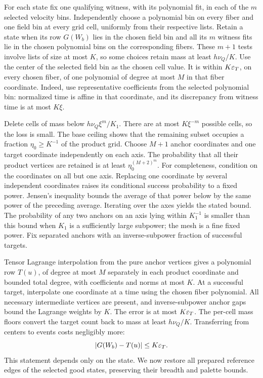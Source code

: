 For each state fix one qualifying witness, with its polynomial fit,
in each of the \(m\) selected velocity bins. Independently choose a
polynomial bin on every fiber and one field bin at every grid cell,
uniformly from their respective lists.
Retain a state when its row \(G(W_b)\) lies in the chosen field bin
and all its \(m\) witness fits lie in the chosen polynomial bins on
the corresponding fibers. These \(m+1\) tests involve lists of size
at most \(K\), so some choices retain mass at least \(h\nu_Q/K\).
Use the center of the selected field bin as the chosen cell value.
It is within \(K\varepsilon_T\), on every chosen fiber, of one polynomial
of degree at most \(M\) in that fiber coordinate. Indeed, use
representative coefficients from the selected polynomial bin:
normalized time is affine in that coordinate, and its discrepancy
from witness time is at most \(K\xi\).

Delete cells of mass below \(h\nu_Q\xi^m/K_1\).
There are at most \(K\xi^{-m}\) possible cells, so the loss is
small. The base ceiling shows that the remaining subset occupies
a fraction \(\eta_0\geq K^{-1}\) of the product grid.
Choose \(M+1\) anchor coordinates and one target coordinate
independently on each axis. The probability that all their
product vertices are retained is at least
\(\eta_0^{(M+2)^m}\).
For completeness, condition on the coordinates on all but one
axis. Replacing one coordinate by several independent coordinates
raises its conditional success probability to a fixed power.
Jensen's inequality bounds the average of that power below by
the same power of the preceding average. Iterating over the
axes yields the stated bound.
The probability of any two anchors on an axis lying within
\(K_1^{-1}\) is smaller than this bound when \(K_1\) is a
sufficiently large subpower; the mesh is a fine fixed power.
Fix separated anchors with an inverse-subpower fraction of
successful targets.

Tensor Lagrange interpolation from the pure anchor vertices gives
a polynomial row \(T(u)\), of degree at most \(M\) separately in
each product coordinate and bounded total degree, with coefficients
and norms at most \(K\).
At a successful target, interpolate one coordinate at a time
using the chosen fiber polynomial. All necessary intermediate
vertices are present, and inverse-subpower anchor gaps bound the
Lagrange weights by \(K\). The error is at most \(K\varepsilon_T\).
The per-cell mass floors convert the target count back to mass
at least \(h\nu_Q/K\). Transferring from centers to events costs
negligibly more:
\begin{equation}\label{a05:interpolated-field}
 |G(W_b)-T(u)|\leq K\varepsilon_T.
\end{equation}
This statement depends only on the state. We now restore all
prepared reference edges of the selected good states, preserving
their breadth and palette bounds.

